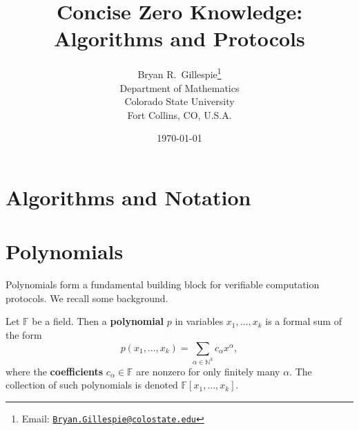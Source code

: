 \documentclass[12pt]{article}
\theoremstyle{plain}
\theoremstyle{definition}
\newcommand{\defn}[1]{\textbf{#1}}
\newcommand{\NN}{\mathbb{N}}                  %
\newcommand{\FF}{\mathbb{F}}                  %
\newcommand*{\dd}{\mathbin{..}}
\begin{document}
\title{Concise Zero Knowledge: \\ Algorithms and Protocols}

\author{Bryan R.\ Gillespie\footnote{Email: \href{mailto:Bryan.Gillespie@colostate.edu}{\texttt{Bryan.Gillespie@colostate.edu}}}\\[1ex] Department of Mathematics\\ Colorado State University\\ Fort Collins, CO, U.S.A.}

\date{\today}

\maketitle








\section{Algorithms and Notation}







\section{Polynomials}

Polynomials form a fundamental building block for verifiable computation protocols.  We recall some background.

Let $\FF$ be a field.  Then a \defn{polynomial} $p$ in variables $x_1, \ldots, x_k$ is a formal sum of the form
\[
  p(x_1, \ldots, x_k) = \sum_{\alpha \in \NN^k} c_{\alpha} x^\alpha,
\]
where the \defn{coefficients} $c_\alpha \in \FF$ are nonzero for only finitely many $\alpha$.  The collection of such polynomials is denoted $\FF[x_1, \ldots, x_k]$.
\end{document}
